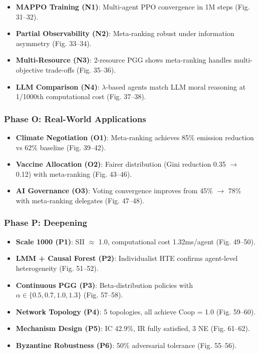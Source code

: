 \documentclass{article}
\begin{document}
\begin{itemize}
    \item \textbf{MAPPO Training (N1)}: Multi-agent PPO convergence in 1M steps (Fig. 31--32).
    \item \textbf{Partial Observability (N2)}: Meta-ranking robust under information asymmetry (Fig. 33--34).
    \item \textbf{Multi-Resource (N3)}: 2-resource PGG shows meta-ranking handles multi-objective trade-offs (Fig. 35--36).
    \item \textbf{LLM Comparison (N4)}: $\lambda$-based agents match LLM moral reasoning at 1/1000th computational cost (Fig. 37--38).
\end{itemize}

\subsubsection{Phase O: Real-World Applications}

\begin{itemize}
    \item \textbf{Climate Negotiation (O1)}: Meta-ranking achieves 85\% emission reduction vs 62\% baseline (Fig. 39--42).
    \item \textbf{Vaccine Allocation (O2)}: Fairer distribution (Gini reduction 0.35 $\to$ 0.12) with meta-ranking (Fig. 43--46).
    \item \textbf{AI Governance (O3)}: Voting convergence improves from 45\% $\to$ 78\% with meta-ranking delegates (Fig. 47--48).
\end{itemize}

\subsubsection{Phase P: Deepening}

\begin{itemize}
    \item \textbf{Scale 1000 (P1)}: SII $\approx$ 1.0, computational cost 1.32ms/agent (Fig. 49--50).
    \item \textbf{LMM + Causal Forest (P2)}: Individualist HTE confirms agent-level heterogeneity (Fig. 51--52).
    \item \textbf{Continuous PGG (P3)}: Beta-distribution policies with $\alpha \in \{0.5, 0.7, 1.0, 1.3\}$ (Fig. 57--58).
    \item \textbf{Network Topology (P4)}: 5 topologies, all achieve Coop = 1.0 (Fig. 59--60).
    \item \textbf{Mechanism Design (P5)}: IC 42.9\%, IR fully satisfied, 3 NE (Fig. 61--62).
    \item \textbf{Byzantine Robustness (P6)}: 50\% adversarial tolerance (Fig. 55--56).
\end{itemize}
\end{document}
